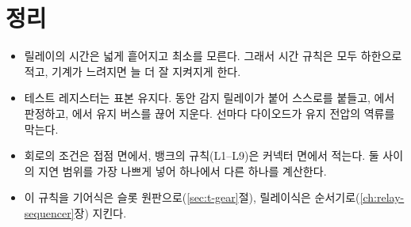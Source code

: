 \section{정리}

\begin{itemize}
\item 릴레이의 시간은 넓게 흩어지고 최소를 모른다. 그래서 시간 규칙은 모두 하한으로 적고, 기계가 느려지면 늘
더 잘 지켜지게 한다.
\item 테스트 레지스터는 표본 유지다.  동안 감지 릴레이가 붙어 스스로를 붙들고, 에서
판정하고, 에서 유지 버스를 끊어 지운다. 선마다 다이오드가 유지 전압의 역류를 막는다.
\item 회로의 조건은 접점 면에서, 뱅크의 규칙(L1--L9)은 커넥터 면에서 적는다. 둘 사이의 지연 범위를 가장 나쁘게
넣어 하나에서 다른 하나를 계산한다.
\item 이 규칙을 기어식은 슬롯 원판으로(\ref{sec:t-gear}절), 릴레이식은 순서기로(\ref{ch:relay-sequencer}장) 지킨다.
\end{itemize}
